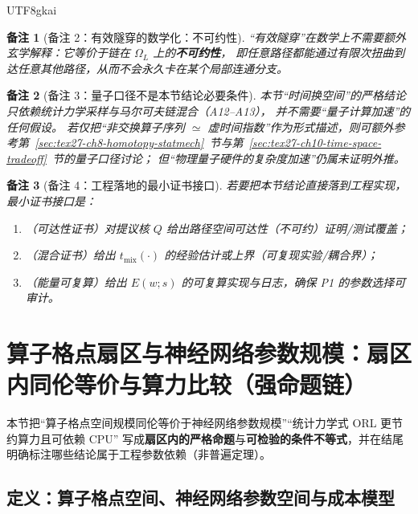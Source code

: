 \documentclass[12pt]{article}
\newtheorem{remark}{备注}[section]
\begin{document}
\begin{CJK*}{UTF8}{gkai}
\begin{remark}[备注 2：有效隧穿的数学化：不可约性]
\label{rem:tex27-ch11-r2}
“有效隧穿”在数学上不需要额外玄学解释：它等价于链在 $\Omega_L$ 上的\textbf{不可约性}，
即任意路径都能通过有限次扭曲到达任意其他路径，从而不会永久卡在某个局部连通分支。
\end{remark}

\begin{remark}[备注 3：量子口径不是本节结论必要条件]
\label{rem:tex27-ch11-r3}
本节“时间换空间”的严格结论只依赖统计力学采样与马尔可夫链混合（A12--A13），
并不需要“量子计算加速”的任何假设。
若仅把“非交换算子序列 $\simeq$ 虚时间指数”作为形式描述，则可额外参考第~\ref{sec:tex27-ch8-homotopy-statmech}~节与第~\ref{sec:tex27-ch10-time-space-tradeoff}~节的量子口径讨论；
但“物理量子硬件的复杂度加速”仍属未证明外推。
\end{remark}

\begin{remark}[备注 4：工程落地的最小证书接口]
\label{rem:tex27-ch11-r4}
若要把本节结论直接落到工程实现，最小证书接口是：
\begin{enumerate}
  \item（可达性证书）对提议核 $Q$ 给出路径空间可达性（不可约）证明/测试覆盖；
  \item（混合证书）给出 $t_{\mathrm{mix}}(\cdot)$ 的经验估计或上界（可复现实验/耦合界）；
  \item（能量可复算）给出 $E(w;s)$ 的可复算实现与日志，确保 P1 的参数选择可审计。
\end{enumerate}
\end{remark}

\section{算子格点扇区与神经网络参数规模：扇区内同伦等价与算力比较（强命题链）}
\label{sec:tex27-ch12-sector-nn-scale}

本节把“算子格点空间规模同伦等价于神经网络参数规模”“统计力学式 ORL 更节约算力且可依赖 CPU”
写成\textbf{扇区内的严格命题}与\textbf{可检验的条件不等式}，并在结尾明确标注哪些结论属于工程参数依赖（非普遍定理）。

\subsection{定义：算子格点空间、神经网络参数空间与成本模型}
\label{subsec:tex27-ch12-defs}


\end{CJK*}
\end{document}
